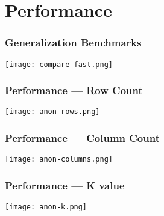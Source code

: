 \section{Performance}

\begin{frame}
    \frametitle{Generalization Benchmarks}
    \centering
    \texttt{[image: compare-fast.png]}
\end{frame}

\begin{frame}
    \frametitle{Performance --- Row Count}
    \centering
    \texttt{[image: anon-rows.png]}
\end{frame}

\begin{frame}
    \frametitle{Performance --- Column Count}
    \centering
    \texttt{[image: anon-columns.png]}
\end{frame}

\begin{frame}
    \frametitle{Performance --- K value}
    \centering
    \texttt{[image: anon-k.png]}
\end{frame}